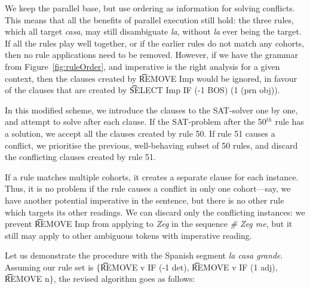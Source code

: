 We keep the parallel base, but use ordering as information for solving conflicts.
This means that all the benefits of parallel execution still hold: the three rules, which all target \emph{casa}, may still disambiguate \emph{la}, without \emph{la} ever being the target.
If all the rules play well together, or if the earlier rules do not match any cohorts, 
then no rule applications need to be removed. 
However, if we have the grammar from Figure~\ref{fig:ruleOrder}, 
and imperative is the right analysis for a given context, then the clauses created by 
\t{REMOVE Imp} would be ignored, in favour of the clauses that are created 
by \t{SELECT Imp IF (-1 BOS) (1 (prn obj))}.




In this modified scheme, we introduce the clauses to the SAT-solver one by one, 
and attempt to solve after each clause. If the SAT-problem after the 50$^{th}$ rule 
has a solution, we accept all the clauses created by rule 50. %
If rule 51 causes a conflict, we prioritise the previous, well-behaving subset of
50 rules, and discard the conflicting clauses created by rule 51.

If a rule matches multiple cohorts, it creates a separate clause for each instance.
Thus, it is no problem if the rule causes a conflict in only one cohort---say, we 
have another potential imperative in the sentence, 
but there is no other rule which targets its other readings. 
We can discard only the conflicting instances: we prevent 
\t{REMOVE Imp} from applying to \emph{Zeg} in the sequence \emph{\# Zeg me}, 
but it still may apply to other ambiguous tokens with imperative reading.


Let us demonstrate the procedure with the Spanish segment {\em la casa grande}.
Assuming our rule set is $\{$\t{REMOVE v IF (-1 det)}, \t{REMOVE v IF (1 adj)}, \t{REMOVE n}$\}$, the revised algorithm goes as follows:


